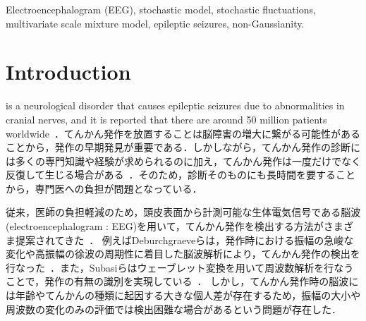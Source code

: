 \documentclass[journal]{IEEEtran}
\begin{document}
\begin{IEEEkeywords}
Electroencephalogram (EEG), stochastic model, stochastic fluctuations, multivariate scale mixture model, epileptic seizures, non-Gaussianity.
\end{IEEEkeywords}






%
\IEEEpeerreviewmaketitle



\section{Introduction}
%
%
%
%
 is a neurological disorder that causes epileptic seizures due to abnormalities in cranial nerves, and it is reported that there are around 50 million patients worldwide~\cite{WHO}．てんかん発作を放置することは脳障害の増大に繋がる可能性があることから，発作の早期発見が重要である．しかしながら，てんかん発作の診断には多くの専門知識や経験が求められるのに加え，てんかん発作は一度だけでなく反復して生じる場合がある~\cite{Kandel2000}．そのため，診断そのものにも長時間を要することから，専門医への負担が問題となっている．

従来，医師の負担軽減のため，頭皮表面から計測可能な生体電気信号である脳波(electroencephalogram : EEG)を用いて，てんかん発作を検出する方法がさまざま提案されてきた~\cite{Deburchgraeve2008,Subasi2005,kellaway1979precise,Panzica1999,fusco1993ictal,Acir2005,Greene2008}．
例えばDeburchgraeveらは，発作時における振幅の急峻な変化や高振幅の徐波の周期性に着目した脳波解析により，てんかん発作の検出を行なった~\cite{Deburchgraeve2008}．また，Subasiらはウェーブレット変換を用いて周波数解析を行なうことで，発作の有無の識別を実現している~\cite{Subasi2005}．
しかし，てんかん発作時の脳波には年齢やてんかんの種類に起因する大きな個人差が存在するため，振幅の大小や周波数の変化のみの評価では検出困難な場合があるという問題が存在した．
\end{document}
